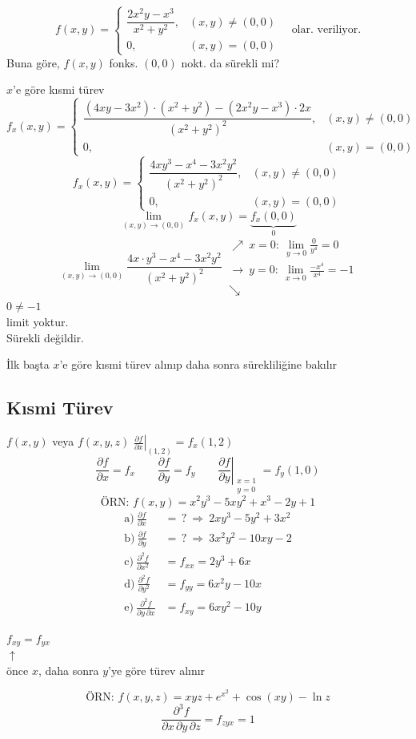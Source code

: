 \documentclass[11pt,a4paper]{article}
\begin{document}
\[ f(x,y)=\begin{cases}\dfrac{2x^2y-x^3}{x^2+y^2}, & (x,y)\neq(0,0)\\[2mm] 0, & (x,y)=(0,0)\end{cases}\quad\text{olar. veriliyor.} \]
Buna göre, $f(x,y)$ fonks. $(0,0)$ nokt. da sürekli mi?

$x$'e göre kısmi türev
\[ f_x(x,y)=\begin{cases}\dfrac{(4xy-3x^2)\cdot(x^2+y^2)-(2x^2y-x^3)\cdot2x}{(x^2+y^2)^2}, & (x,y)\neq(0,0)\\[2mm] 0, & (x,y)=(0,0)\end{cases} \]
\[ f_x(x,y)=\begin{cases}\dfrac{4xy^3-x^4-3x^2y^2}{(x^2+y^2)^2}, & (x,y)\neq(0,0)\\[2mm] 0, & (x,y)=(0,0)\end{cases} \]
\[ \lim_{(x,y)\to(0,0)}f_x(x,y)=\underbrace{f_x(0,0)}_{0} \]
\[ \lim_{(x,y)\to(0,0)}\frac{4x\cdot y^3-x^4-3x^2y^2}{(x^2+y^2)^2}\ \begin{array}{l}\nearrow\ x=0:\ \displaystyle\lim_{y\to0}\frac{0}{y^4}=0\\[2mm] \to\ y=0:\ \displaystyle\lim_{x\to0}\frac{-x^4}{x^4}=-1\\[2mm] \searrow\end{array} \]
$0\neq-1$\\
limit yoktur.\\
Sürekli değildir.

İlk başta $x$'e göre kısmi türev alınıp daha sonra sürekliliğine bakılır

\subsection{Kısmi Türev}
$f(x,y)$ veya $f(x,y,z)$ \hfill $\displaystyle\left.\frac{\partial f}{\partial x}\right|_{(1,2)}=f_x(1,2)$
\[ \frac{\partial f}{\partial x}=f_x\qquad\frac{\partial f}{\partial y}=f_y\qquad\left.\frac{\partial f}{\partial y}\right|_{\substack{x=1\\ y=0}}=f_y(1,0) \]
\[ \text{ÖRN: }f(x,y)=x^2y^3-5xy^2+x^3-2y+1 \]
\begin{align*}
\text{a)}\ \frac{\partial f}{\partial x}&=\,?\ \Rightarrow\ 2xy^3-5y^2+3x^2\\
\text{b)}\ \frac{\partial f}{\partial y}&=\,?\ \Rightarrow\ 3x^2y^2-10xy-2\\
\text{c)}\ \frac{\partial^2f}{\partial x^2}&=f_{xx}=2y^3+6x\\
\text{d)}\ \frac{\partial^2f}{\partial y^2}&=f_{yy}=6x^2y-10x\\
\text{e)}\ \frac{\partial^2f}{\partial y\,\partial x}&=f_{xy}=6xy^2-10y
\end{align*}
\begin{center}
$f_{xy}=f_{yx}$\\ $\uparrow$\\ önce $x$, daha sonra $y$'ye göre türev alınır
\end{center}
\[ \text{ÖRN: }f(x,y,z)=xyz+e^{x^2}+\cos(xy)-\ln z \]
\[ \frac{\partial^3f}{\partial x\,\partial y\,\partial z}=f_{zyx}=1 \]
\end{document}
